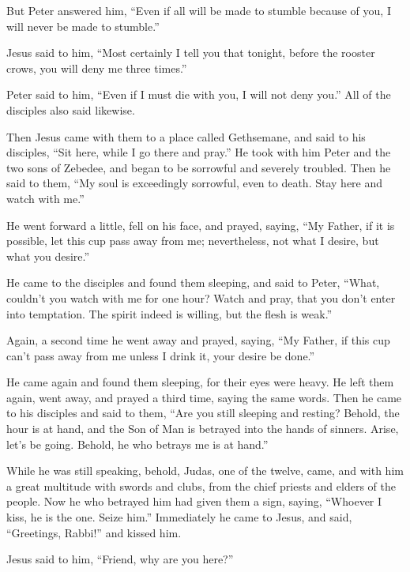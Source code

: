  But Peter answered him, ``Even if all will be made to
stumble because of you, I will never be made to stumble.''

 Jesus said to him, ``Most certainly I tell you that
tonight, before the rooster crows, you will deny me three times.''

 Peter said to him, ``Even if I must die with you, I will
not deny you.'' All of the disciples also said likewise.

 Then Jesus came with them to a place called Gethsemane,
and said to his disciples, ``Sit here, while I go there and pray.''
 He took with him Peter and the two sons of Zebedee, and
began to be sorrowful and severely troubled.  Then he said
to them, ``My soul is exceedingly sorrowful, even to death. Stay here
and watch with me.''

 He went forward a little, fell on his face, and prayed,
saying, ``My Father, if it is possible, let this cup pass away from me;
nevertheless, not what I desire, but what you desire.''

 He came to the disciples and found them sleeping, and said
to Peter, ``What, couldn't you watch with me for one hour? 
Watch and pray, that you don't enter into temptation. The spirit indeed
is willing, but the flesh is weak.''

 Again, a second time he went away and prayed, saying, ``My
Father, if this cup can't pass away from me unless I drink it, your
desire be done.''

 He came again and found them sleeping, for their eyes were
heavy.  He left them again, went away, and prayed a third
time, saying the same words.  Then he came to his disciples
and said to them, ``Are you still sleeping and resting? Behold, the hour
is at hand, and the Son of Man is betrayed into the hands of sinners.
 Arise, let's be going. Behold, he who betrays me is at
hand.''

 While he was still speaking, behold, Judas, one of the
twelve, came, and with him a great multitude with swords and clubs, from
the chief priests and elders of the people.  Now he who
betrayed him had given them a sign, saying, ``Whoever I kiss, he is the
one. Seize him.''  Immediately he came to Jesus, and said,
``Greetings, Rabbi!'' and kissed him.

 Jesus said to him, ``Friend, why are you here?''


